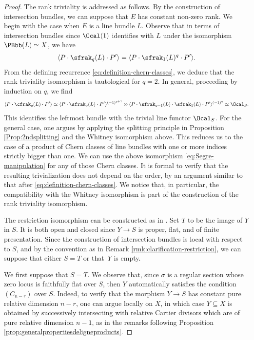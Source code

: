 \begin{proof}
The rank triviality is addressed as follows. By the construction of intersection bundles, we can suppose that $E$ has constant non-zero rank. We begin with the case when $E$ is a line bundle $L$. Observe that in terms of intersection bundles since $\Ocal(1)$ identifies with $L$ under the isomorphism $\PBbb(L)\simeq X$, we have
\begin{displaymath}
\langle P \cdot \sfrak_q(L) \cdot P' \rangle = \langle P \cdot \sfrak_1(L)^q \cdot P' \rangle.
\end{displaymath}
From the defining recurrence \eqref{eq:definition-chern-classes}, we deduce that the rank triviality isomorphism is tautological for $q=2$. In general, proceeding by induction on $q$, we find
\begin{equation}\label{eq:Segre-manipulation}
\langle P \cdot \cfrak_{q}(L) \cdot P' \rangle \simeq \langle P \cdot \sfrak_{q}(L) \cdot P' \rangle^{(-1)^{q+1}} \otimes \langle P \cdot \sfrak_{q-1}(L) \cdot \sfrak_1(L) \cdot P' \rangle^{(-1)^{q}} \simeq \Ocal_S.
\end{equation}
This identifies the leftmost bundle with the trivial line functor $\Ocal_S$. For the general case, one argues by applying the splitting principle in Proposition \ref{Prop:2ndsplitting} and the Whitney isomorphism above. This reduces us to the case of a product of Chern classes of line bundles with one or more indices strictly bigger than one. We can use the above isomorphism \eqref{eq:Segre-manipulation} for any of those Chern classes. It is formal to verify that the resulting trivialization does not depend on the order, by an argument similar to that after \eqref{eq:definition-chern-classes}. We notice that, in particular, the compatibility with the Whitney isomorphism is part of the construction of the rank triviality isomorphism.

The restriction isomorphism can be constructed as in \cite[\textsection V.4.9]{Elkikfib}. Set $T$ to be the image of $Y$ in $S$. It is both open and closed since $Y\to S$ is proper, flat, and of finite presentation. Since the construction of intersection bundles is local with respect to $S$, and by the convention as in Remark \ref{rmk:clarification-restriction}, we can suppose that either $S = T$ or that~$Y$ is empty.

We first suppose that $S=T$. We observe that, since $\sigma$ is a regular section whose zero locus is faithfully flat over $S$, then $Y$ automatically satisfies the condition $(C_{n-r})$ over $S$. Indeed, to verify that the morphism $Y \to S$ has constant pure relative dimension $n-r$, one can argue locally on $X$, in which case $Y \subseteq X$ is obtained by successively intersecting with relative Cartier divisors which are of pure relative dimension $n-1$, as in the remarks following Proposition \ref{prop:generalpropertiesdeligneproducts}.


\end{proof}
